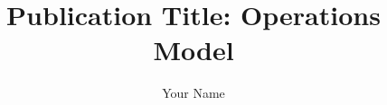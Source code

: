 \documentclass[noarxiv]{../../latex_styles/quantum/quantumarticle}
\begin{document}
\title{Publication Title: Operations Model}
\author{Your Name}

\maketitle



\printbibliography
\end{document}
